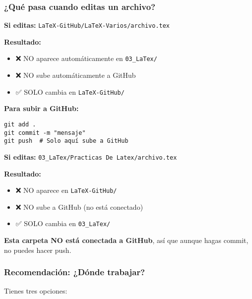 \documentclass[12pt,a4paper]{article}
\begin{document}
\subsubsection{¿Qué pasa cuando editas un archivo?}

\begin{warningbox}
\textbf{Si editas:} \texttt{LaTeX-GitHub/LaTeX-Varios/archivo.tex}

\textbf{Resultado:}
\begin{itemize}
  \item ❌ NO aparece automáticamente en \texttt{03\_LaTex/}
  \item ❌ NO sube automáticamente a GitHub
  \item ✅ SOLO cambia en \texttt{LaTeX-GitHub/}
\end{itemize}

\textbf{Para subir a GitHub:}
\begin{lstlisting}[style=bashstyle]
git add .
git commit -m "mensaje"
git push  # Solo aquí sube a GitHub
\end{lstlisting}
\end{warningbox}

\begin{warningbox}
\textbf{Si editas:} \texttt{03\_LaTex/Practicas De Latex/archivo.tex}

\textbf{Resultado:}
\begin{itemize}
  \item ❌ NO aparece en \texttt{LaTeX-GitHub/}
  \item ❌ NO sube a GitHub (no está conectado)
  \item ✅ SOLO cambia en \texttt{03\_LaTex/}
\end{itemize}

\textbf{Esta carpeta NO está conectada a GitHub}, así que aunque hagas commit, no puedes hacer push.
\end{warningbox}

\subsubsection{Recomendación: ¿Dónde trabajar?}

Tienes tres opciones:
\end{document}
